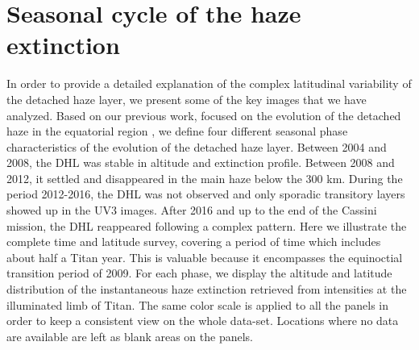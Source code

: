 \section{Seasonal cycle of the haze extinction}

In order to provide a detailed explanation of the complex latitudinal variability of the detached haze layer, we present
some of the key images that we have analyzed. Based on our previous work, focused on the evolution of the detached haze in the
equatorial region \citep{West2018}, we define four different seasonal phase characteristics of the evolution of the detached haze layer.
Between 2004 and 2008, the DHL was stable in altitude and extinction profile.
Between 2008 and 2012, it settled and disappeared in the main haze below the 300 km.
During the period 2012-2016, the DHL was not observed and only sporadic transitory layers showed up in the UV3 images.
After 2016 and up to the end of the Cassini mission, the DHL reappeared following a complex pattern.
Here we illustrate the complete time and latitude survey, covering a period of time which includes about half a Titan year.
This is valuable because it encompasses the equinoctial transition period of 2009.
For each phase, we display the altitude and latitude distribution of the instantaneous haze extinction  retrieved from intensities at the illuminated limb of Titan.
The same color scale is applied to all the panels in order to keep a consistent view on the whole data-set.
Locations where no data are available are left as blank areas on the panels.




